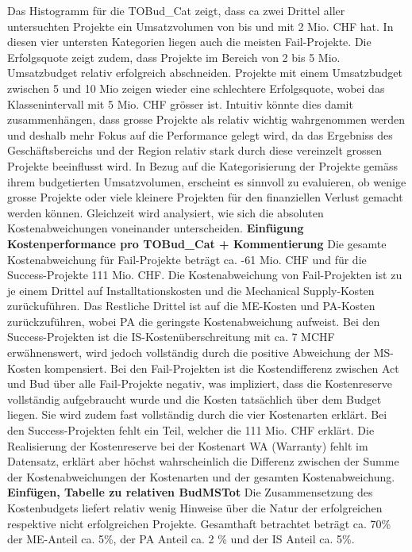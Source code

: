 Das Histogramm für die TOBud\_Cat zeigt, dass ca zwei Drittel aller untersuchten Projekte ein Umsatzvolumen von bis und mit 2 Mio. CHF hat. In diesen vier untersten Kategorien liegen auch die meisten Fail-Projekte.  Die Erfolgsquote zeigt zudem, dass Projekte im Bereich von 2 bis 5 Mio. Umsatzbudget relativ erfolgreich abschneiden. Projekte mit einem Umsatzbudget zwischen 5 und 10 Mio zeigen wieder eine schlechtere Erfolgsquote, wobei das Klassenintervall mit 5 Mio. CHF grösser ist. Intuitiv könnte dies damit zusammenhängen, dass grosse Projekte als relativ wichtig wahrgenommen werden und deshalb mehr Fokus auf die Performance gelegt wird, da das Ergebniss des Geschäftsbereichs und der Region relativ stark durch diese vereinzelt grossen Projekte beeinflusst wird. In Bezug auf die Kategorisierung der Projekte gemäss ihrem budgetierten Umsatzvolumen, erscheint es sinnvoll zu evaluieren, ob wenige grosse Projekte oder viele kleinere Projekten für den finanziellen Verlust gemacht werden können. Gleichzeit wird analysiert, wie sich die absoluten Kostenabweichungen voneinander unterscheiden. 
\newline\textbf{Einfügung Kostenperformance pro TOBud\_Cat + Kommentierung}
\newline Die gesamte Kostenabweichung für Fail-Projekte beträgt ca. -61 Mio. CHF und für die Success-Projekte 111 Mio. CHF. Die Kostenabweichung von Fail-Projekten ist zu je einem Drittel auf Installtationskosten und die Mechanical Supply-Kosten zurückuführen. Das Restliche Drittel ist auf die ME-Kosten und PA-Kosten zurückzuführen, wobei PA die geringste Kostenabweichung aufweist. Bei den Success-Projekten ist die IS-Kostenüberschreitung mit ca. 7 MCHF erwähnenswert, wird jedoch vollständig durch die positive Abweichung der MS-Kosten kompensiert. Bei den Fail-Projekten ist die Kostendifferenz zwischen Act und Bud über alle Fail-Projekte negativ, was impliziert, dass die Kostenreserve vollständig aufgebraucht wurde und die Kosten tatsächlich über dem Budget liegen. Sie wird zudem fast vollständig durch die vier Kostenarten erklärt. Bei den Success-Projekten fehlt ein Teil, welcher die 111 Mio. CHF erklärt. Die Realisierung der Kostenreserve bei der Kostenart WA (Warranty) fehlt im Datensatz, erklärt aber höchst wahrscheinlich die Differenz zwischen der Summe der Kostenabweichungen der Kostenarten und der gesamten Kostenabweichung. 
\newline\textbf{Einfügen, Tabelle zu relativen BudMSTot}
Die Zusammensetzung des Kostenbudgets liefert relativ wenig Hinweise über die Natur der erfolgreichen respektive nicht erfolgreichen Projekte. Gesamthaft betrachtet beträgt ca. 70\% der ME-Anteil ca. 5\%, der PA Anteil ca. 2 \% und der IS Anteil ca. 5\%.
